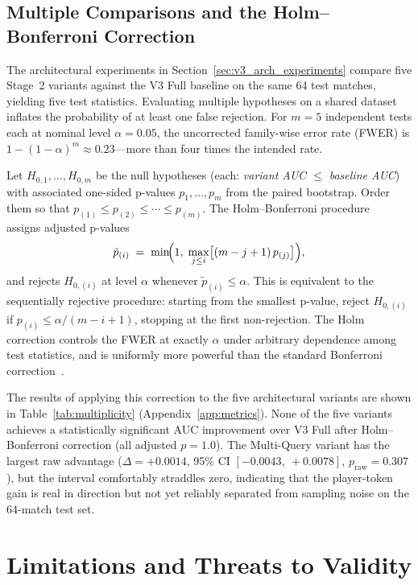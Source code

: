 \subsection{Multiple Comparisons and the Holm--Bonferroni Correction}
\label{sec:holm}

The architectural experiments in Section~\ref{sec:v3_arch_experiments} compare five Stage~2 variants against the V3 Full baseline on the same 64 test matches, yielding five test statistics. Evaluating multiple hypotheses on a shared dataset inflates the probability of at least one false rejection. For $m = 5$ independent tests each at nominal level $\alpha = 0.05$, the uncorrected family-wise error rate (FWER) is $1 - (1 - \alpha)^m \approx 0.23$---more than four times the intended rate.

Let $H_{0,1}, \ldots, H_{0,m}$ be the null hypotheses (each: \emph{variant AUC $\leq$ baseline AUC}) with associated one-sided p-values $p_1, \ldots, p_m$ from the paired bootstrap. Order them so that $p_{(1)} \leq p_{(2)} \leq \cdots \leq p_{(m)}$. The Holm--Bonferroni procedure~\cite{holm1979} assigns adjusted p-values
\begin{equation}
    \tilde{p}_{(i)}
    \;=\;
    \min\!\Bigl(1,\;\max_{j \leq i}\bigl[(m - j + 1)\,p_{(j)}\bigr]\Bigr),
    \label{eq:holm}
\end{equation}
and rejects $H_{0,(i)}$ at level $\alpha$ whenever $\tilde{p}_{(i)} \leq \alpha$. This is equivalent to the sequentially rejective procedure: starting from the smallest p-value, reject $H_{0,(i)}$ if $p_{(i)} \leq \alpha / (m - i + 1)$, stopping at the first non-rejection. The Holm correction controls the FWER at exactly $\alpha$ under arbitrary dependence among test statistics, and is uniformly more powerful than the standard Bonferroni correction~\cite{holm1979}.

The results of applying this correction to the five architectural variants are shown in Table~\ref{tab:multiplicity} (Appendix~\ref{app:metrics}). None of the five variants achieves a statistically significant AUC improvement over V3 Full after Holm--Bonferroni correction (all adjusted $p = 1.0$). The Multi-Query variant has the largest raw advantage ($\Delta = +0.0014$, 95\% CI $[-0.0043,\ +0.0078]$, $p_{\text{raw}} = 0.307$), but the interval comfortably straddles zero, indicating that the player-token gain is real in direction but not yet reliably separated from sampling noise on the 64-match test set.

\section{Limitations and Threats to Validity}

